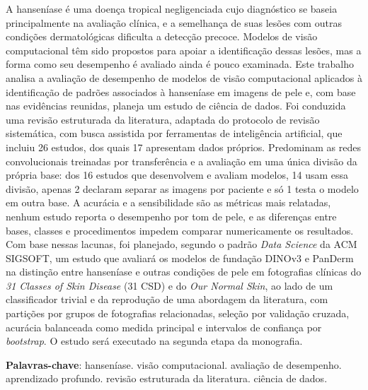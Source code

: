 \begin{resumo}
	A hanseníase é uma doença tropical negligenciada cujo diagnóstico se
	baseia principalmente na avaliação clínica, e a semelhança de suas lesões
	com outras condições dermatológicas dificulta a detecção precoce. Modelos de
	visão computacional têm sido propostos para apoiar a identificação dessas
	lesões, mas a forma como seu desempenho é avaliado ainda é pouco examinada.
	Este trabalho analisa a avaliação de desempenho de modelos de visão
	computacional aplicados à identificação de padrões associados à hanseníase
	em imagens de pele e, com base nas evidências reunidas, planeja um estudo de
	ciência de dados. Foi conduzida uma revisão estruturada da literatura,
	adaptada do protocolo de revisão sistemática, com busca assistida por
	ferramentas de inteligência artificial, que incluiu 26 estudos, dos quais 17
	apresentam dados próprios. Predominam as redes convolucionais treinadas por
	transferência e a avaliação em uma única divisão da própria base: dos 16
	estudos que desenvolvem e avaliam modelos, 14 usam essa divisão, apenas 2
	declaram separar as imagens por paciente e só 1 testa o modelo em outra
	base. A acurácia e a sensibilidade são as métricas mais relatadas, nenhum
	estudo reporta o desempenho por tom de pele, e as diferenças entre bases,
	classes e procedimentos impedem comparar numericamente os resultados. Com
	base nessas lacunas, foi planejado, segundo o padrão \textit{Data Science}
	da ACM SIGSOFT, um estudo que avaliará os modelos de fundação DINOv3 e
	PanDerm na distinção entre hanseníase e outras condições de pele em
	fotografias clínicas do \textit{31 Classes of Skin Disease} (31 CSD) e do \textit{Our Normal Skin}, ao lado de um
	classificador trivial e da reprodução de uma abordagem da literatura, com
	partições por grupos de fotografias relacionadas, seleção por validação
	cruzada, acurácia balanceada como medida principal e intervalos de
	confiança por \textit{bootstrap}. O estudo será
	executado na segunda etapa da monografia.

	\vspace{\onelineskip}

	\noindent
	\textbf{Palavras-chave}: hanseníase. visão computacional. avaliação de
	desempenho. aprendizado profundo. revisão estruturada da literatura.
	ciência de dados.
\end{resumo}
